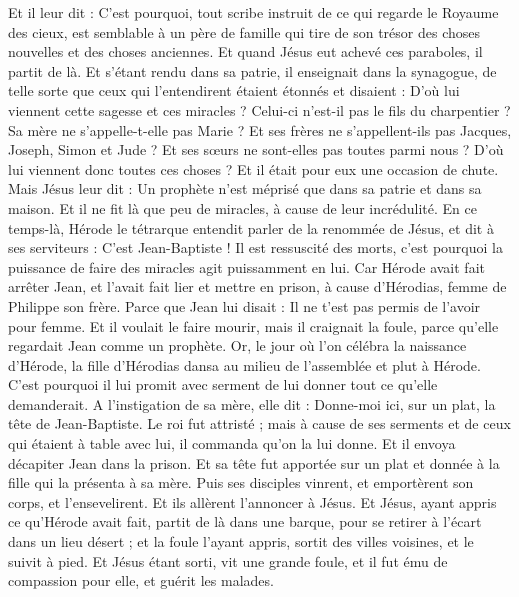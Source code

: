\begin{multicols}{2}
Et il leur dit : C'est pourquoi, tout scribe instruit de ce qui regarde le Royaume des cieux, est semblable à un père de famille qui tire de son trésor des choses nouvelles et des choses anciennes.
Et quand Jésus eut achevé ces paraboles, il partit de là.
Et s'étant rendu dans sa patrie, il enseignait dans la synagogue, de telle sorte que ceux qui l'entendirent étaient étonnés et disaient : D'où lui viennent cette sagesse et ces miracles ?
Celui-ci n'est-il pas le fils du charpentier ? Sa mère ne s'appelle-t-elle pas Marie ? Et ses frères ne s'appellent-ils pas Jacques, Joseph, Simon et Jude ?
Et ses sœurs ne sont-elles pas toutes parmi nous ? D'où lui viennent donc toutes ces choses ?
Et il était pour eux une occasion de chute. Mais Jésus leur dit : Un prophète n'est méprisé que dans sa patrie et dans sa maison.
Et il ne fit là que peu de miracles, à cause de leur incrédulité.
\VerseOne{}En ce temps-là, Hérode le tétrarque entendit parler de la renommée de Jésus, et dit à ses serviteurs : C'est Jean-Baptiste !
Il est ressuscité des morts, c'est pourquoi la puissance de faire des miracles agit puissamment en lui.
Car Hérode avait fait arrêter Jean, et l'avait fait lier et mettre en prison, à cause d'Hérodias, femme de Philippe son frère.
Parce que Jean lui disait : Il ne t'est pas permis de l'avoir pour femme.
Et il voulait le faire mourir, mais il craignait la foule, parce qu'elle regardait Jean comme un prophète.
Or, le jour où l'on célébra la naissance d'Hérode, la fille d'Hérodias dansa au milieu de l'assemblée et plut à Hérode.
C'est pourquoi il lui promit avec serment de lui donner tout ce qu'elle demanderait.
A l'instigation de sa mère, elle dit : Donne-moi ici, sur un plat, la tête de Jean-Baptiste.
Le roi fut attristé ; mais à cause de ses serments et de ceux qui étaient à table avec lui, il commanda qu'on la lui donne.
Et il envoya décapiter Jean dans la prison.
Et sa tête fut apportée sur un plat et donnée à la fille qui la présenta à sa mère.
Puis ses disciples vinrent, et emportèrent son corps, et l'ensevelirent. Et ils allèrent l'annoncer à Jésus.
Et Jésus, ayant appris ce qu'Hérode avait fait, partit de là dans une barque, pour se retirer à l'écart dans un lieu désert ; et la foule l'ayant appris, sortit des villes voisines, et le suivit à pied.
Et Jésus étant sorti, vit une grande foule, et il fut ému de compassion pour elle, et guérit les malades.

\end{multicols}
